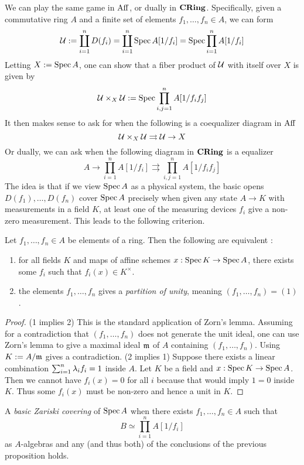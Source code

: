 \documentclass[./main.tex]{subfiles}
\begin{document}
We can play the same game in $\mathrm{Aff}$,
or dually in $\mathbf{CRing}$.
Specifically, given a commutative ring $A$
and a finite set of elements $f_1 , \dots , f_n \in A$,
we can form \[
  \mathcal{U} := \coprod_{i = 1}^{n} D(f_i) 
  = \coprod_{i = 1}^{n} \operatorname{Spec} A[1 / f_i]
  = \operatorname{Spec} \prod_{i = 1}^n A[1 / f_i]
\]
Letting $X := \operatorname{Spec} A$, one can show that 
a fiber product of $\mathcal{U}$ with itself over $X$ is given by 
\[
  \mathcal{U} \times_X \mathcal{U} := \operatorname{Spec} \prod_{i , j = 1}^n A[1 / f_i f_j]  
\]
It then makes sense to ask for when
the following is a coequalizer diagram in $\mathrm{Aff}$
\[
  \mathcal{U} \times_X \mathcal{U} \rightrightarrows \mathcal{U} \to X  
\]
Or dually, we can ask when the following diagram in $\mathbf{CRing}$
is a equalizer
\[
  A \to \prod_{i = 1}^n A[1 / f_i] \rightrightarrows 
  \prod_{i , j = 1}^n A[1 / f_i f_j]  
\]
The idea is that if we view $\operatorname{Spec} A$ as a physical system,
the basic opens $D(f_1) , \dots , D(f_n)$ cover $\operatorname{Spec} A$
precisely when given any state $A \to K$ with measurements in a field $K$,
at least one of the measuring devices $f_i$ give a non-zero measurement. 
This leads to the following criterion.
\begin{prop}
  
  Let $f_1 , \dots , f_n \in A$ be elements of a ring.
  Then the following are equivalent : 
  \begin{enumerate}
    \item for all fields $K$ and maps of affine schemes $x : \operatorname{Spec} K \to \operatorname{Spec} A$,
    there exists some $f_i$ such that $f_i(x) \in K^\times$.
    \item the elements $f_1 , \dots, f_n$ gives a \emph{partition of unity},
    meaning $(f_1 , \dots , f_n) = (1)$.
  \end{enumerate}
\end{prop}
\begin{proof}
  (1 implies 2) This is the standard application of Zorn's lemma.
  Assuming for a contradiction that $(f_1 , \dots , f_n)$ does not 
  generate the unit ideal,
  one can use Zorn's lemma to give a maximal ideal $\mathfrak{m}$ of $A$
  containing $(f_1 , \dots , f_n)$.
  Using $K := A / \mathfrak{m}$ gives a contradiction.
  (2 implies 1) Suppose there exists a linear combination 
  $\sum_{i = 1}^n \lambda_i f_i = 1$ inside $A$.
  Let $K$ be a field and $x : \operatorname{Spec} K \to \operatorname{Spec} A$.
  Then we cannot have $f_i(x) = 0$ for all $i$ because
  that would imply $1 = 0$ inside $K$.
  Thus some $f_i(x)$ must be non-zero and hence a unit in $K$.
\end{proof}
\begin{dfn}
  
  A \emph{basic Zariski covering} of $\operatorname{Spec} A$
  when there exists $f_1 , \dots , f_n \in A$ such that
  \[
    B \simeq \prod_{i = 1}^n A[1 / f_i]  
  \]
  as $A$-algebras and any (and thus both)
  of the conclusions of the previous proposition holds.
\end{dfn}
\end{document}

